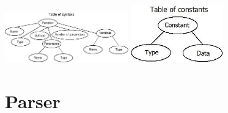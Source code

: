 \documentclass[10pt,a4paper,titlepage]{article}
\begin{document}
\begin{multicols}{2}
  \includegraphics[width=0.4\textwidth]{img/TableOfSymbols.jpg}
  \includegraphics[width=0.3\textwidth]{img/TableOfConstans.jpg}
\end{multicols}

\newpage

\section{Parser}
\end{document}
